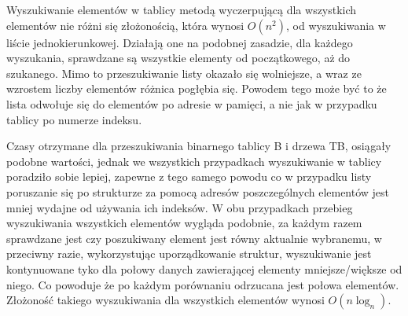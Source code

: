 \documentclass[polish,polish,a4paper]{article}
\begin{document}
Wyszukiwanie elementów w tablicy metodą wyczerpującą dla wszystkich elementów nie różni się złożonością, która wynosi $O(n^2)$,  od wyszukiwania w liście jednokierunkowej. Działają one na podobnej zasadzie, dla każdego wyszukania, sprawdzane są wszystkie elementy od początkowego, aż do szukanego. Mimo to przeszukiwanie listy okazało się wolniejsze, a wraz ze wzrostem liczby elementów różnica pogłębia się.  Powodem tego może być to że lista odwołuje się do elementów po adresie w pamięci, a nie jak w przypadku tablicy po numerze indeksu.

Czasy otrzymane dla przeszukiwania binarnego tablicy B i drzewa TB, osiągały podobne wartości, jednak we wszystkich przypadkach wyszukiwanie w tablicy poradziło sobie lepiej, zapewne z tego samego powodu co w przypadku listy poruszanie się po strukturze za pomocą adresów poszczególnych elementów jest mniej wydajne od używania ich indeksów. W obu przypadkach przebieg wyszukiwania wszystkich elementów wygląda podobnie, za każdym razem sprawdzane jest czy poszukiwany element jest równy aktualnie wybranemu, w przeciwny razie, wykorzystując uporządkowanie struktur, wyszukiwanie jest kontynuowane tyko dla połowy danych zawierającej elementy mniejsze/większe od niego. Co powoduje że po każdym porównaniu odrzucana jest połowa elementów. Złożoność takiego wyszukiwania dla wszystkich elementów wynosi $O(n\log_{n})$.
\end{document}
